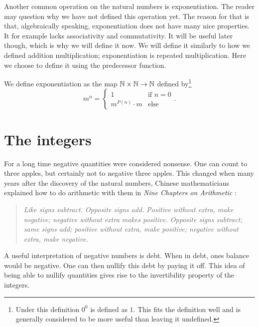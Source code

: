 \documentclass[../main.tex]{subfiles}
\begin{document}
Another common operation on the natural numbers is exponentiation. The reader may question why we have not defined this operation yet. The reason for that is that, algebraically speaking, exponentiation does not have many nice properties. It for example lacks associativity and commutativity. It will be useful later though, which is why we will define it now. We will define it similarly to how we defined addition multiplication; exponentiation is repeated multiplication. Here we choose to define it using the predecessor function.
\begin{definition}
    We define exponentiation as the map $\mathbb{N}\times\mathbb{N}\to\mathbb{N}$ defined by\footnote{Under this definition $0^0$ is defined as $1$. This fits the definition well and is generally considered to be more useful than leaving it undefined.}
    \begin{equation*}
        m^n=
        \begin{cases}
            1 & \text{if }n=0 \\
            m^{P(n)}\cdot m & \text{else}
        \end{cases}.
    \end{equation*}
\end{definition}

\section{The integers}\label{sec:the_natural_numbers_integers_and_rational_numbers:the_integers}
For a long time negative quantities were considered nonsense. One can count to three apples, but certainly not to negative three apples. This changed when many years after the discovery of the natural numbers, Chinese mathematicians explained how to do arithmetic with them in \textit{Nine Chapters on Arithmetic} \cite{NineChapters20}:
\begin{quote}
\end{quote}
\begin{quote}
    \textit{Like signs subtract. Opposite signs add. Positive without extra, make negative; negative without extra makes positive. Opposite signs subtract; same signs add; positive without extra, make positive; negative without extra, make negative.}
\end{quote}
A useful interpretation of negative numbers is debt. When in debt, ones balance would be negative. One can then nullify this debt by paying it off. This idea of being able to nullify quantities gives rise to the invertibility property of the integers.
\end{document}
